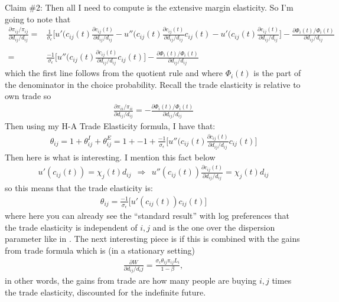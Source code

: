 \documentclass[12pt,pdftex]{article}
\begin{document}
\begin{onehalfspacing}
Claim \#2: Then all I need to compute is the extensive margin elasticity. So I'm going to note that
\begin{align}
\frac{\partial \pi_{ij} / \pi_{ij}}{\partial d_{ij} / d_{ij}} =& \frac{1}{\sigma_{\epsilon}} \bigg [ u'(c_{ij}(t)\frac{\partial c_{ij}(t)}{\partial d_{ij}/ d_{ij}} - u''(c_{ij}(t)\frac{\partial c_{ij}(t)}{\partial d_{ij}/ d_{ij}}c_{ij}(t) - u'(c_{ij}(t)\frac{\partial c_{ij}(t)}{\partial d_{ij}/ d_{ij}} \bigg] - \frac{\partial \Phi_{i}(t) /\Phi_i(t)}{\partial d_{ij}/ d_{ij}} \\
\nonumber \\
=& \frac{-1}{\sigma_{\epsilon}} \bigg [ u''(c_{ij}(t)\frac{\partial c_{ij}(t)}{\partial d_{ij}/ d_{ij}}c_{ij}(t) \bigg] - \frac{\partial \Phi_{i}(t) /\Phi_i(t)}{\partial d_{ij}/ d_{ij}}
\end{align}
which the first line follows from the quotient rule and where $\Phi_{i}(t)$ is the part of the denominator in the choice probability. Recall the trade elasticity is relative to own trade so
\begin{align}
\frac{\partial \pi_{ii} / \pi_{ii}}{\partial d_{ij} / d_{ij}} = - \frac{\partial \Phi_{i}(t) /\Phi_i(t)}{\partial d_{ij}/ d_{ij}}
\end{align}
Then using my H-A Trade Elasticity formula, I have that:
\begin{align}
\theta_{ij} = 1 + \theta_{ij}^{I} + \theta_{ij}^{E} = 1 + -1 + \frac{-1}{\sigma_{\epsilon}} \bigg [ u''(c_{ij}(t)\frac{\partial c_{ij}(t)}{\partial d_{ij}/ d_{ij}}c_{ij}(t) \bigg]
\end{align}
Then here is what is interesting. I mention this fact below
\begin{align}
u'(c_{ij}(t) ) = \chi_{j}(t) d_{ij} \ \ \Rightarrow \ \ u''(c_{ij}(t))\frac{\partial c_{ij}(t)}{\partial d_{ij} / d_{ij}} = \chi_{j}(t)d_{ij}
\end{align}
so this means that the trade elasticity is:
\begin{align}
\theta_{ij} =  \frac{-1}{\sigma_{\epsilon}} \bigg [ u'(c_{ij}(t)) c_{ij}(t) \bigg]
\end{align}
where here you can already see the ``standard result'' with log preferences that the trade elasticity is independent of $i,j$ and is the one over the dispersion parameter like in \citet{eaton2002technology}. The next interesting piece is if this is combined with the gains from trade formula which is (in a stationary setting)
\begin{align}
\frac{\partial W}{\partial d_{ij} / d_ij} =  \frac{\sigma_{\epsilon} \theta_{ij} \pi_{ij}L_{i}}{1-\beta} ,
\end{align}
in other words, the gains from trade are how many people are buying $i,j$ times the trade elasticity, discounted for the indefinite future.


\end{onehalfspacing}
\end{document}

